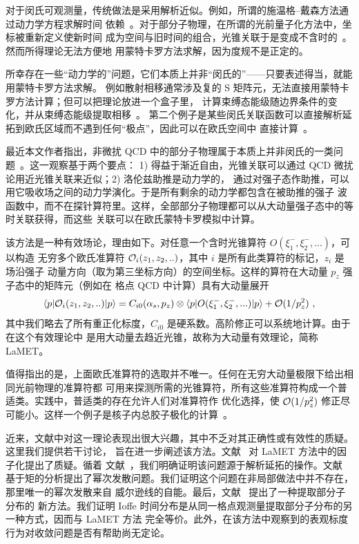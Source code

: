 对于闵氏可观测量，传统做法是采用解析近似。例如，所谓的施温格--戴森方法通过动力学方程求解时间
依赖~\cite{Roberts:1994dr}。对于部分子物理，在所谓的光前量子化方法中，坐标被重新定义使新时间
成为空间与旧时间的组合，光锥关联于是变成不含时的~\cite{Burkardt:1995ct}。然而所得理论无法方便地
用蒙特卡罗方法求解，因为度规不是正定的。

所幸存在一些``动力学的''问题，它们本质上并非``闵氏的''——只要表述得当，就能用蒙特卡罗方法求解。
例如散射相移通常涉及复的 S 矩阵元，无法直接用蒙特卡罗方法计算；但可以把理论放进一个盒子里，
计算束缚态能级随边界条件的变化，并从束缚态能级提取相移~\cite{Luscher:1986pf,Luscher:1990ck,Luscher:1990ux,Briceno:2017max}。
第二个例子是某些闵氏关联函数可以直接解析延拓到欧氏区域而不遇到任何``极点''，因此可以在欧氏空间中
直接计算~\cite{Ji:2001wha}。

最近本文作者指出，非微扰 QCD 中的部分子物理属于本质上并非闵氏的一类问题~\cite{Ji:2013fga,Ji:2013dva,Hatta:2013gta,Xiong:2013bka,
Ji:2014gla,Ji:2014lra,Ji:2015jwa,Ji:2015qla,Xiong:2015nua}。这一观察基于两个要点：
1) 得益于渐近自由，光锥关联可以通过 QCD 微扰论用近光锥关联来近似；2) 洛伦兹助推是动力学的，
通过对强子态作助推，可以用它吸收场之间的动力学演化。于是所有剩余的动力学都包含在被助推的强子
波函数中，而不在探针算符里。这样，全部部分子物理都可以从大动量强子态中的等时关联获得，而这些
关联可以在欧氏蒙特卡罗模拟中计算。

该方法是一种有效场论，理由如下。对任意一个含时光锥算符 $O(\xi^-_1,\xi^-_2, ...)$，可以构造
无穷多个欧氏准算符 ${\cal O}_i(z_1,z_2,..)$，其中 $i$ 是所有此类算符的标记，$z_i$ 是场沿强子
动量方向（取为第三坐标方向）的空间坐标。这样的算符在大动量 $p_z$ 强子态中的矩阵元（例如在
格点 QCD 中计算）具有大动量展开~\cite{Ji:2014gla}
\begin{equation} \label{eq:fact}
\langle p|{\cal O}_i(z_1,z_2,..)|p\rangle
= C_{i0}(\alpha_s,p_z)\otimes\langle p|O(\xi^-_1,\xi^-_2, ...)|p\rangle + {\cal O}(1/p^2_z)\ ,
\end{equation}
其中我们略去了所有重正化标度，$C_{i0}$ 是硬系数。高阶修正可以系统地计算。由于在这个有效理论中
是用大动量去趋近光锥，故称为大动量有效理论，简称 LaMET。

值得指出的是，上面欧氏准算符的选取并不唯一。任何在无穷大动量极限下给出相同光前物理的准算符都
可用来探测所需的光锥算符，所有这些准算符构成一个普适类。实践中，普适类的存在允许人们对准算符作
优化选择，使 ${\cal O}(1/p_z^2)$ 修正尽可能小。这样一个例子是核子内总胶子极化的计算~\cite{Hatta:2013gta}。

近来，文献中对这一理论表现出很大兴趣，其中不乏对其正确性或有效性的质疑。这里我们提供若干讨论，
旨在进一步阐述该方法。文献~\cite{Carlson:2017gpk} 对 LaMET 方法中的因子化提出了质疑。循着
文献~\cite{Briceno:2017cpo}，我们明确证明该问题源于解析延拓的操作。文献~\cite{Rossi:2017muf}
基于矩的分析提出了幂次发散问题。我们证明这个问题在非局部做法中并不存在，那里唯一的幂次发散来自
威尔逊线的自能。最后，文献~\cite{Radyushkin:2017cyf,Orginos:2017kos} 提出了一种提取部分子分布的
新方法。我们证明 Ioffe 时间分布是从同一格点观测量提取部分子分布的另一种方式，因而与 LaMET 方法
完全等价。此外，在该方法中观察到的表观标度行为对收敛问题是否有帮助尚无定论。
